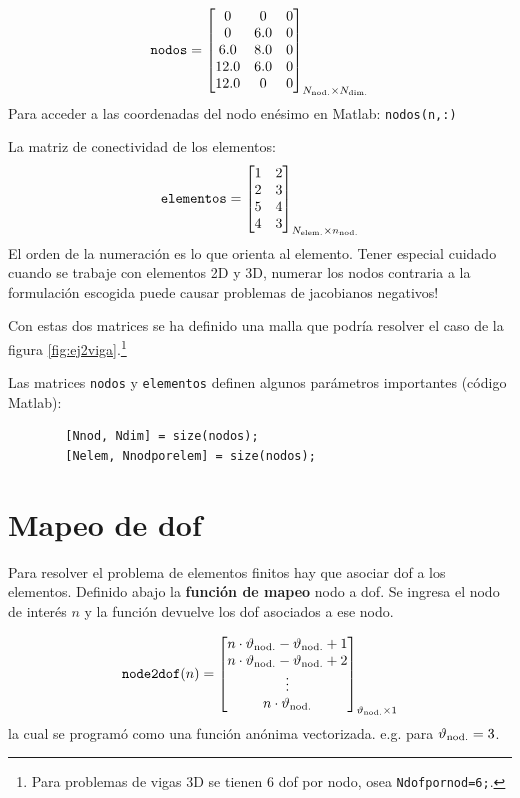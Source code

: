 \documentclass[11pt, a4paper,titlepage]{article}
\newcommand{\rmfont}[1]{{\fontfamily{ptm}\selectfont%
#1}}
\newcommand{\Matlab}{\rmfont{\sc Matlab}}
\begin{document}
\begin{equation}
	\texttt{nodos} = \begin{bmatrix}
	0 & 0 & 0 \\
	0 & 6.0 & 0 \\
	6.0 & 8.0 & 0 \\
	12.0 & 6.0 & 0 \\
	12.0 & 0 & 0
	\end{bmatrix}_{ N_{\mathrm{nod.}} \times N_{\mathrm{dim.}} }
\end{equation}
Para acceder a las coordenadas del nodo enésimo en \Matlab: \texttt{nodos(n,:)}

La matriz de conectividad de los elementos:
\begin{equation} \label{eq:MatrizElementosEjemplo}
\texttt{elementos} = \begin{bmatrix}
1 & 2  \\
2 & 3  \\
5 & 4 \\
4 & 3 
\end{bmatrix}_{ N_{\mathrm{elem.}} \times n_{\mathrm{nod.}} } 
\end{equation}
El orden de la numeración es lo que orienta al elemento. Tener especial cuidado cuando se trabaje con elementos 2D y 3D, numerar los nodos contraria a la formulación escogida puede causar problemas de jacobianos negativos!

Con estas dos matrices se ha definido una malla que podría resolver el caso de la figura \ref{fig:ej2viga}.\footnote{Para problemas de vigas 3D se tienen 6 dof por nodo, osea \texttt{Ndofpornod=6;}.}

Las matrices \texttt{nodos} y \texttt{elementos} definen algunos parámetros importantes (código \Matlab):
\begin{verbatim}
	    [Nnod, Ndim] = size(nodos);
	    [Nelem, Nnodporelem] = size(nodos);
\end{verbatim}


\section{Mapeo de dof} \label{sec:dofmapping}

Para resolver el problema de elementos finitos hay que asociar dof a los elementos. Definido abajo la \textbf{función de mapeo} nodo a dof. Se ingresa el nodo de interés $n$ y la función devuelve los dof asociados a ese nodo.

\begin{equation}
	\texttt{node2dof}(n) = \begin{bmatrix}
	n\cdot\vartheta_{\mathrm{nod.}}-\vartheta_{\mathrm{nod.}} +1 \\ n\cdot\vartheta_{\mathrm{nod.}}-\vartheta_{\mathrm{nod.}} +2 \\ \vdots \\ n\cdot\vartheta_{\mathrm{nod.}}
	\end{bmatrix}_{\vartheta_{\mathrm{nod.}}\times 1}
\end{equation}
la cual se programó como una función anónima vectorizada. e.g. para $\vartheta_{\mathrm{nod.}}=3$.
\end{document}
